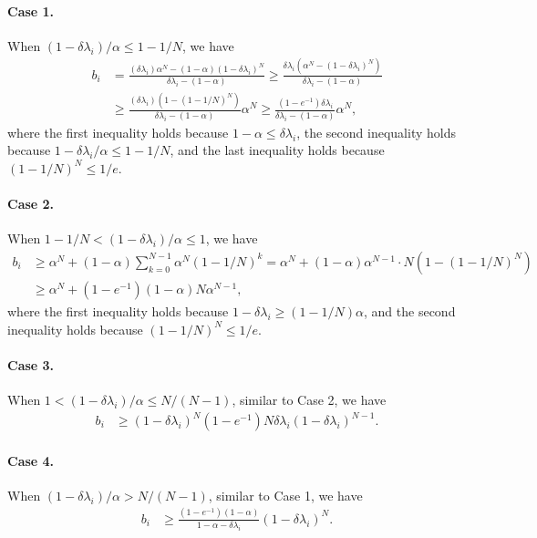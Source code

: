 \documentclass[11pt]{article}
\begin{document}
\paragraph{Case 1.}
When $(1-\delta\lambda_i)/\alpha\le1-1/N$, we have
\begin{align*}
b_i&=\frac{(\delta\lambda_i)\alpha^N-(1-\alpha)(1-\delta\lambda_i)^N}{\delta\lambda_i-(1-\alpha)}\ge\frac{\delta\lambda_i(\alpha^N-(1-\delta\lambda_i)^N)}{\delta\lambda_i-(1-\alpha)}\\
&\ge\frac{(\delta\lambda_i)(1-(1-1/N)^N)}{\delta\lambda_i-(1-\alpha)}\alpha^N\ge\frac{(1-e^{-1})\delta\lambda_i}{\delta\lambda_i-(1-\alpha)}\alpha^N,
\end{align*}
where the first inequality holds because $1-\alpha\le\delta\lambda_i$, the second inequality holds because $1-\delta\lambda_i/\alpha\le1-1/N$, and the last inequality holds because $(1-1/N)^N\le1/e$.

\paragraph{Case 2.}
When $1-1/N<(1-\delta\lambda_i)/\alpha\le1$, we have
\begin{align*}
b_i&\ge\alpha^N+(1-\alpha)\sum_{k=0}^{N-1}\alpha^N(1-1/N)^k=\alpha^N+(1-\alpha)\alpha^{N-1}\cdot N(1-(1-1/N)^N)\\
&\ge\alpha^N+(1-e^{-1})(1-\alpha)N\alpha^{N-1},
\end{align*}
where the first inequality holds because $1-\delta\lambda_i\ge(1-1/N)\alpha$, and the second inequality holds because $(1-1/N)^N\le1/e$.

\paragraph{Case 3.}
When $1<(1-\delta\lambda_i)/\alpha\le N/(N-1)$, similar to Case 2, we have
\begin{align*}
b_i&\ge(1-\delta\lambda_i)^N(1-e^{-1})N\delta\lambda_i(1-\delta\lambda_i)^{N-1}.
\end{align*}

\paragraph{Case 4.}
When $(1-\delta\lambda_i)/\alpha>N/(N-1)$, similar to Case 1, we have
\begin{align*}
b_i&\ge\frac{(1-e^{-1})(1-\alpha)}{1-\alpha-\delta\lambda_i}(1-\delta\lambda_i)^N.
\end{align*}
\end{document}
